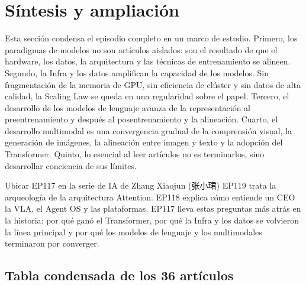 \section{Síntesis y ampliación}

Esta sección condensa el episodio completo en un marco de estudio. Primero, los paradigmas de modelos no son artículos aislados: son el resultado de que el hardware, los datos, la arquitectura y las técnicas de entrenamiento se alineen. Segundo, la Infra y los datos amplifican la capacidad de los modelos. Sin fragmentación de la memoria de GPU, sin eficiencia de clúster y sin datos de alta calidad, la Scaling Law se queda en una regularidad sobre el papel. Tercero, el desarrollo de los modelos de lenguaje avanza de la representación al preentrenamiento y después al posentrenamiento y la alineación. Cuarto, el desarrollo multimodal es una convergencia gradual de la comprensión visual, la generación de imágenes, la alineación entre imagen y texto y la adopción del Transformer. Quinto, lo esencial al leer artículos no es terminarlos, sino desarrollar conciencia de sus límites.

\begin{importantbox}{Ubicar EP117 en la serie de IA de Zhang Xiaojun (张小珺)}
EP119 trata la arqueología de la arquitectura Attention. EP118 explica cómo entiende un CEO la VLA, el Agent OS y las plataformas. EP117 lleva estas preguntas más atrás en la historia: por qué ganó el Transformer, por qué la Infra y los datos se volvieron la línea principal y por qué los modelos de lenguaje y los multimodales terminaron por converger.
\end{importantbox}

\subsection{Tabla condensada de los 36 artículos}

